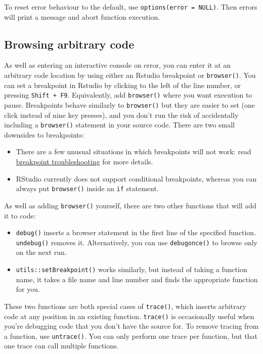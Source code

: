 To reset error behaviour to the default, use
\texttt{options(error = NULL)}. Then errors will print a message and
abort function execution.

\subsection{Browsing arbitrary code}

As well as entering an interactive console on error, you can enter it at
an arbitrary code location by using either an Rstudio breakpoint or
\texttt{browser()}. You can set a breakpoint in Rstudio by clicking to
the left of the line number, or pressing \texttt{Shift + F9}.
Equivalently, add \texttt{browser()} where you want execution to pause.
Breakpoints behave similarly to \texttt{browser()} but they are easier
to set (one click instead of nine key presses), and you don't run the
risk of accidentally including a \texttt{browser()} statement in your
source code. There are two small downsides to breakpoints:
 

\begin{itemize}
\item
  There are a few unusual situations in which breakpoints will not work:
  read
  \href{http://www.rstudio.com/ide/docs/debugging/breakpoint-troubleshooting}{breakpoint
  troubleshooting} for more details.
\item
  RStudio currently does not support conditional breakpoints, whereas
  you can always put \texttt{browser()} inside an \texttt{if} statement.
\end{itemize}

As well as adding \texttt{browser()} yourself, there are two other
functions that will add it to code:

\begin{itemize}
\item
  \texttt{debug()} inserts a browser statement in the first line of the
  specified function. \texttt{undebug()} removes it. Alternatively, you
  can use \texttt{debugonce()} to browse only on the next run.
\item
  \texttt{utils::setBreakpoint()} works similarly, but instead of taking
  a function name, it takes a file name and line number and finds the
  appropriate function for you. 
\end{itemize}

These two functions are both special cases of \texttt{trace()}, which
inserts arbitrary code at any position in an existing function.
\texttt{trace()} is occasionally useful when you're debugging code that
you don't have the source for. To remove tracing from a function, use
\texttt{untrace()}. You can only perform one trace per function, but
that one trace can call multiple functions. 

